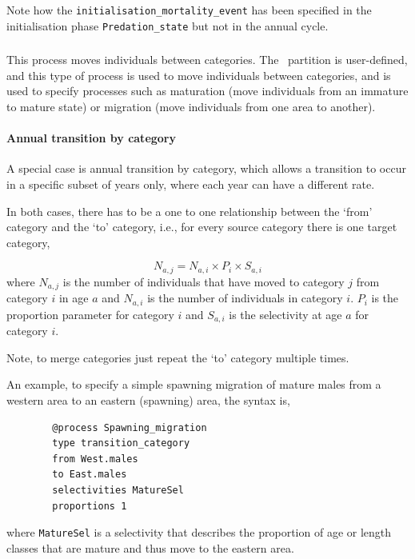 Note how the \texttt{initialisation\_mortality\_event} has been specified in the initialisation phase \texttt{Predation\_state} but not in the annual cycle.



\subsubsection{}

This process moves individuals between categories. The \CNAME\ partition is user-defined, and this type of process is used to move individuals between categories, and is used to specify processes such as maturation (move individuals from an immature to mature state) or migration (move individuals from one area to another). 

\paragraph{Annual transition by category}

A special case is annual transition by category, which allows a transition to occur in a specific subset of years only, where each year can have a different rate.

In both cases, there has to be a one to one relationship between the `from' category and the `to' category, i.e., for every source category there is one target category, 

\begin{equation}
	N_{a,j} = N_{a,i} \times P_i \times S_{a,i}
\end{equation}
where $N_{a,j}$ is the number of individuals that have moved to category $j$ from category $i$ in age $a$ and $N_{a,i}$ is the number of individuals in category $i$. $P_i$ is the proportion parameter for category $i$ and $S_{a,i}$ is the selectivity at age $a$ for category $i$.

Note, to merge categories just repeat the `to' category multiple times. 

An example, to specify a simple spawning migration of mature males from a western area to an eastern (spawning) area, the syntax is,
{\small{\begin{verbatim}
		@process Spawning_migration
		type transition_category
		from West.males	
		to East.males	
		selectivities MatureSel
		proportions 1
		\end{verbatim}}}

where \texttt{MatureSel} is a selectivity that describes the proportion of age or length classes that are mature and thus move to the eastern area.

